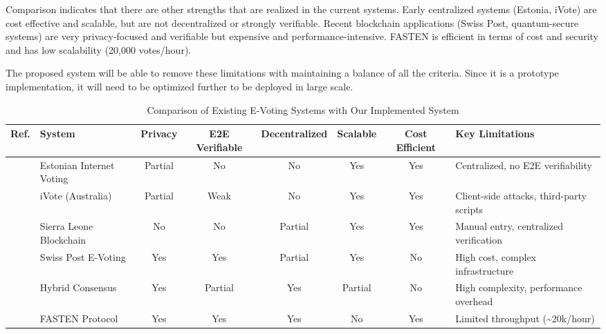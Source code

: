\documentclass[12pt, a4paper]{report}
\begin{document}
Comparison indicates that there are other strengths that are realized in the current systems. Early centralized systems (Estonia, iVote) are cost effective and scalable, but are not decentralized or strongly verifiable. Recent blockchain applications (Swiss Post, quantum-secure systems) are very privacy-focused and verifiable but expensive and performance-intensive. FASTEN is efficient in terms of cost and security and has low scalability (20,000 votes/hour).

The proposed system will be able to remove these limitations with maintaining a balance of all the criteria. Since it is a prototype implementation, it will need to be optimized further to be deployed in large scale.

\begin{landscape}
\begin{table}[p]
\centering
\caption{Comparison of Existing E-Voting Systems with Our Implemented System}
\label{tab:comparison}
\begin{adjustbox}{max width=\linewidth}
\begin{tabular}{|c|m{3.5cm}|c|c|c|c|c|m{4.5cm}|}
\hline
\textbf{Ref.} & \textbf{System} & \textbf{Privacy} & \textbf{E2E Verifiable} & \textbf{Decentralized} & \textbf{Scalable} & \textbf{Cost Efficient} & \textbf{Key Limitations} \\ \hline

\cite{madise2005evoting} & Estonian Internet Voting & Partial & No & No & Yes & Yes & Centralized, no E2E verifiability \\ \hline

\cite{halderman2015ivote} & iVote (Australia) & Partial & Weak & No & Yes & Yes & Client-side attacks, third-party scripts \\ \hline

\cite{chohan2018sierra_leone} & Sierra Leone Blockchain & No & No & Partial & Yes & Yes & Manual entry, centralized verification \\ \hline

\cite{federalchancellery_evoting} & Swiss Post E-Voting & Yes & Yes & Partial & Yes & No & High cost, complex infrastructure \\ \hline

\cite{abuidris2021secure} & Hybrid Consensus & Yes & Partial & Yes & Partial & No & High complexity, performance overhead \\ \hline

\cite{damle2021fasten} & FASTEN Protocol & Yes & Yes & Yes & No & Yes & Limited throughput (\textasciitilde20k/hour) \\ \hline


\end{tabular}
\end{adjustbox}
\end{table}
\end{landscape}
\end{document}
